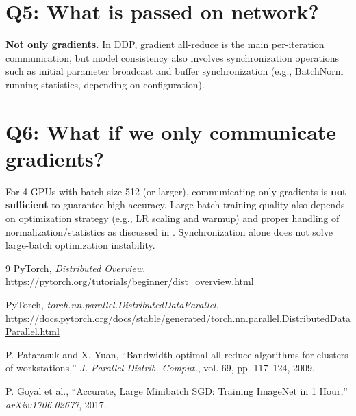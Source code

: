 \documentclass[11pt]{article}
\begin{document}
\section{Q5: What is passed on network?}
\textbf{Not only gradients.}  
In DDP, gradient all-reduce is the main per-iteration communication, but model consistency also involves synchronization operations such as initial parameter broadcast and buffer synchronization (e.g., BatchNorm running statistics, depending on configuration).

\section{Q6: What if we only communicate gradients?}
For 4 GPUs with batch size 512 (or larger), communicating only gradients is \textbf{not sufficient} to guarantee high accuracy.  
Large-batch training quality also depends on optimization strategy (e.g., LR scaling and warmup) and proper handling of normalization/statistics as discussed in \cite{goyal2017}. Synchronization alone does not solve large-batch optimization instability.

\begin{thebibliography}{9}
PyTorch, \emph{Distributed Overview}.\\
\url{https://pytorch.org/tutorials/beginner/dist_overview.html}

PyTorch, \emph{torch.nn.parallel.DistributedDataParallel}.\\
\url{https://docs.pytorch.org/docs/stable/generated/torch.nn.parallel.DistributedDataParallel.html}

P. Patarasuk and X. Yuan, ``Bandwidth optimal all-reduce algorithms for clusters of workstations,'' \emph{J. Parallel Distrib. Comput.}, vol. 69, pp. 117--124, 2009.

P. Goyal et al., ``Accurate, Large Minibatch SGD: Training ImageNet in 1 Hour,'' \emph{arXiv:1706.02677}, 2017.
\end{thebibliography}
\end{document}
